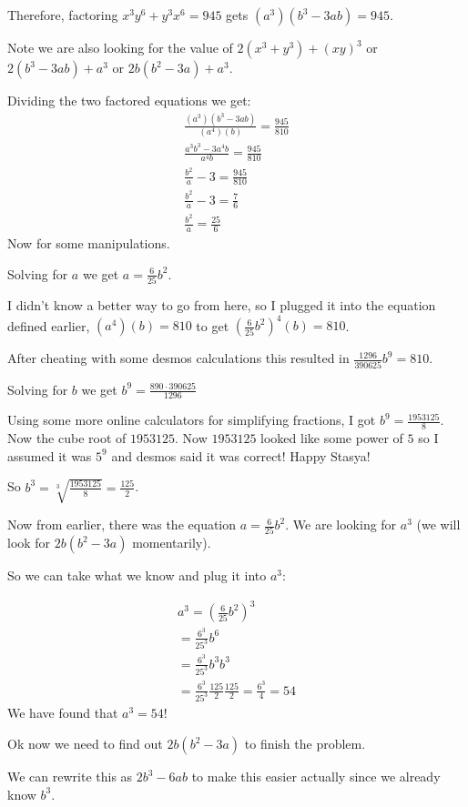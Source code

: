 \documentclass[../mathproblems.tex]{subfiles}
\begin{document}
Therefore, factoring $x^3y^6+y^3x^6=945$ gets $(a^3)(b^3-3ab)=945$.

Note we are also looking for the value of $2(x^3+y^3)+(xy)^3$ or $2(b^3-3ab)+a^3$ or $2b(b^2-3a)+a^3$.

Dividing the two factored equations we get:
\begin{align*} \frac{(a^3)(b^3-3ab)}{(a^4)(b)}=\frac{945}{810} \\ \frac{a^3b^3-3a^4b}{a^4b} = \frac{945}{810}\\ \frac{b^2}{a}-3 = \frac{945}{810}\\ \frac{b^2}{a}-3 = \frac{7}{6}\\ \frac{b^2}{a}= \frac{25}{6} \end{align*}
Now for some manipulations.

Solving for $a$ we get $a=\frac{6}{25}b^2$.

I didn't know a better way to go from here, so I plugged it into the equation defined earlier, $(a^4)(b)=810$ to get
$\left(\frac{6}{25}b^2\right)^4(b)=810$.

After cheating with some desmos calculations this resulted in $\frac{1296}{390625}b^9=810$.

Solving for $b$ we get $b^9 = \frac{890\cdot 390625}{1296}$

Using some more online calculators for simplifying fractions, I got $b^9=\frac{1953125}{8}$. Now the cube root of $1953125$. Now $1953125$ looked like some power of $5$ so I assumed it was $5^9$ and desmos said it was correct! Happy Stasya!

So $b^3 = \sqrt[3]{\frac{1953125}{8}} = \frac{125}{2}$.

Now from earlier, there was the equation $a=\frac{6}{25}b^2$. We are looking for $a^3$ (we will look for $2b(b^2-3a)$ momentarily).

So we can take what we know and plug it into $a^3$:

\begin{align*} a^3 = \left(\frac{6}{25}b^2\right)^3 \\ = \frac{6^3}{25^3}b^6\\ = \frac{6^3}{25^3}b^3b^3\\ =\frac{6^3}{25^3}\frac{125}{2}\frac{125}{2} =\frac{6^3}{4} =54 \end{align*}We have found that $a^3 = 54$!

Ok now we need to find out $2b(b^2-3a)$ to finish the problem.

We can rewrite this as $2b^3-6ab$ to make this easier actually since we already know $b^3$.
\end{document}
